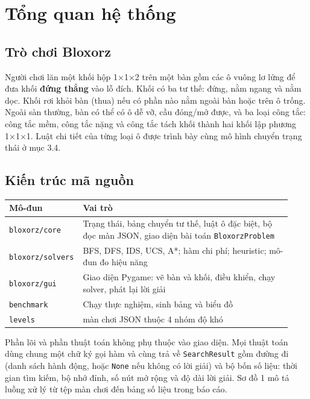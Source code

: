 \section{Tổng quan hệ thống}

\subsection{Trò chơi Bloxorz}

Người chơi lăn một khối hộp 1×1×2 trên một bàn gồm các ô vuông lơ lửng để đưa khối \textbf{đứng thẳng} vào lỗ đích. Khối có ba tư thế: đứng, nằm ngang và nằm dọc. Khối rơi khỏi bàn (thua) nếu có phần nào nằm ngoài bàn hoặc trên ô trống. Ngoài sàn thường, bàn có thể có ô dễ vỡ, cầu đóng/mở được, và ba loại công tắc: công tắc mềm, công tắc nặng và công tắc tách khối thành hai khối lập phương 1×1×1. Luật chi tiết của từng loại ô được trình bày cùng mô hình chuyển trạng thái ở mục 3.4.

\subsection{Kiến trúc mã nguồn}

{\renewcommand{\arraystretch}{1.25}
\begin{longtable}{|>{\raggedright\arraybackslash}p{0.199\linewidth}|>{\raggedright\arraybackslash}p{0.731\linewidth}|}
\hline
\textbf{Mô-đun} & \textbf{Vai trò} \\ \hline
\endhead
\hline
\endlastfoot
\texttt{bloxorz/core} & Trạng thái, bảng chuyển tư thế, luật ô đặc biệt, bộ đọc màn JSON, giao diện bài toán \texttt{BloxorzProblem} \\ \hline
\texttt{bloxorz/solvers} & BFS, DFS, IDS, UCS, A*; hàm chi phí; heuristic; mô-đun đo hiệu năng \\ \hline
\texttt{bloxorz/gui} & Giao diện Pygame: vẽ bàn và khối, điều khiển, chạy solver, phát lại lời giải \\ \hline
\texttt{benchmark} & Chạy thực nghiệm, sinh bảng và biểu đồ \\ \hline
\texttt{levels} & 16 màn chơi JSON thuộc 4 nhóm độ khó \\
\end{longtable}
}

Phần lõi và phần thuật toán không phụ thuộc vào giao diện. Mọi thuật toán dùng chung một chữ ký gọi hàm và cùng trả về \texttt{SearchResult} gồm đường đi (danh sách hành động, hoặc \texttt{None} nếu không có lời giải) và bộ bốn số liệu: thời gian tìm kiếm, bộ nhớ đỉnh, số nút mở rộng và độ dài lời giải. Sơ đồ 1 mô tả luồng xử lý từ tệp màn chơi đến bảng số liệu trong báo cáo.

